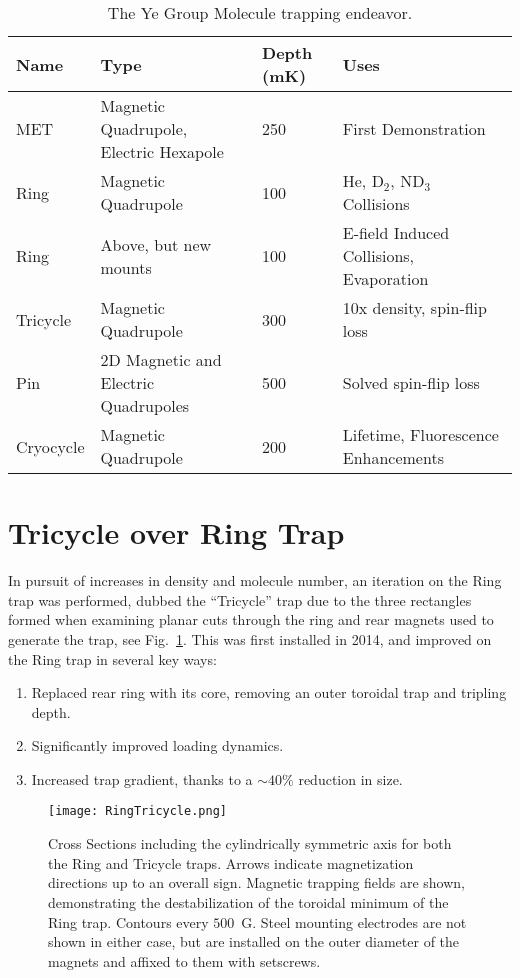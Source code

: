 \renewcommand{\arraystretch}{1.5}
\begin{table}[t!]
\centering
\caption{
The Ye Group Molecule trapping endeavor.\label{trappingtable}
}
\begin{tabular}{ L{2.5cm} | C{4.5cm} C{2.5cm} C{4.5cm} }
Name & Type & Depth (mK) & Uses \\
\hline\hline
MET 	& Magnetic Quadrupole, Electric Hexapole & 250 	& First Demonstration~\cite{Sawyer2007} 	 \\
\hline
Ring 		& Magnetic Quadrupole				& 100 	& He, D$_2$, ND$_3$ Collisions~\cite{Sawyer2008,Sawyer2011} \\
\hline
Ring 		& Above, but new mounts				& 100 	& E-field Induced Collisions,  Evaporation~\cite{Stuhl2012uwave,Stuhl2012evap,Stuhl2013} \\
\hline
Tricycle 	& Magnetic Quadrupole 				& 300 	& 10x density, spin-flip loss \\
\hline
Pin  		& 2D Magnetic and Electric Quadrupoles 	& 500 	& Solved spin-flip loss~\cite{Reens2017}\\
\hline
Cryocycle 	& Magnetic Quadrupole 				& 200 	& Lifetime, Fluorescence Enhancements\\
\end{tabular}
\end{table}


\section{Tricycle over Ring Trap}

In pursuit of increases in density and molecule number, an iteration on the Ring trap was performed, dubbed the ``Tricycle'' trap due to the three rectangles formed when examining planar cuts through the ring and rear magnets used to generate the trap, see Fig.~\ref{ringtricyclefigure}.
This was first installed in 2014, and improved on the Ring trap in several key ways:
\begin{enumerate}
\item Replaced rear ring with its core, removing an outer toroidal trap and tripling depth.
\item Significantly improved loading dynamics.
\item Increased trap gradient, thanks to a $\sim 40\%$ reduction in size.
\end{enumerate}

\begin{figure}[t!]
\texttt{[image: RingTricycle.png]}
\caption[Ring and Tricycle Trap Comparison]{\label{ringtricyclefigure}
Cross Sections including the cylindrically symmetric axis for both the Ring and Tricycle traps. Arrows indicate magnetization directions up to an overall sign. Magnetic trapping fields are shown, demonstrating the destabilization of the toroidal minimum of the Ring trap. Contours every $500$~G. Steel mounting electrodes are not shown in either case, but are installed on the outer diameter of the magnets and affixed to them with setscrews.
}
\end{figure}

